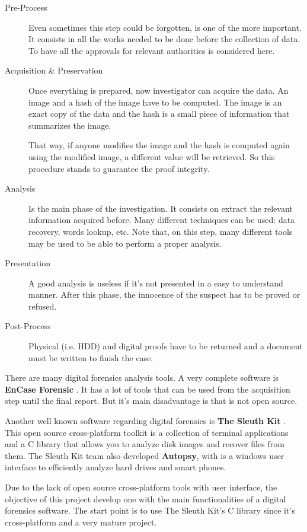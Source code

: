 \begin{description}
	\item [Pre-Process]
		Even sometimes this step could be forgotten, is one of the more
		important. It consists in all the works needed to be done before
		the collection of data. To have all the approvals for relevant
		authorities is considered here.

	\item [Acquisition \& Preservation]
		Once everything is prepared, now investigator can acquire the
		data. An image and a hash of the image have to be computed. The
		image is an exact copy of the data and the hash is a small piece
		of information that summarizes the image.

		That way, if anyone modifies the image and the hash is computed
		again using the modified image, a different value will be 
		retrieved. So this procedure stands to guarantee the proof 
		integrity.

	\item [Analysis]
		Is the main phase of the investigation. It consists on extract
		the relevant information acquired before. Many different 
		techniques can be used: data recovery, words lookup, etc. Note
		that, on this step, many different tools may be used to be able
		to perform a proper analysis.

	\item [Presentation]
		A good analysis is useless if it's not presented in a easy to 
		understand manner. After this phase, the innocence of the
		suspect has to be proved or refused.

	\item [Post-Process]
		Physical (i.e. HDD) and digital proofs have to be returned and
		a document must be written to finish the case.

\end{description}

There are many digital forensics analysis tools. A very complete software is 
\textbf{EnCase Forensic} \cite{encase-web}. It has a lot of tools that can be 
used from the acquisition step until the final report. But it's main 
disadvantage is that is not open source.

Another well known software regarding digital forensics is \textbf{The Sleuth
Kit} \cite{tsk-web}. This open source cross-platform toolkit is a collection 
of terminal applications and a C library that allows you to analyze disk images 
and recover files from them. The Sleuth Kit team also developed
\textbf{Autopsy}, with is a windows user interface to efficiently analyze hard 
drives and smart phones.

Due to the lack of open source cross-platform tools with user interface, the
objective of this project develop one with the main functionalities of a 
digital forensics software. The start point is to use The Sleuth Kit's C library 
since it's cross-platform and a very mature project.

